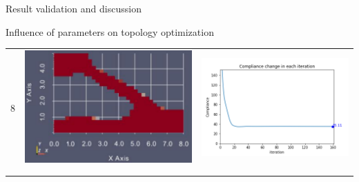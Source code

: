 \documentclass[a4paper,12pt,times]{article}
\begin{document}
\begin{section}{Result validation and discussion}
\begin{subsection}{Influence of parameters on topology optimization}
\begin{center}
\begin{table} [H]
\begin{tabular}{c|c|c}
8&\includegraphics[scale = 0.5]{rmin_8.png} & \includegraphics[scale = 0.4]{MMA_ComplianceVSiteration_rmin_8.png}\\
\\\hline\\ 

\end{tabular}
\end{table}
\end{center}
\end{subsection}
\end{section}
\end{document}
